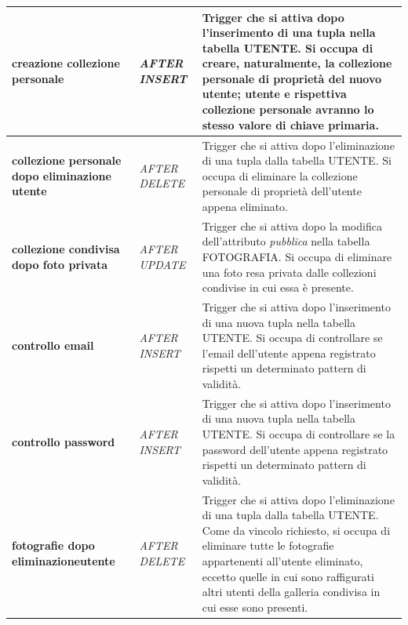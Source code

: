 \documentclass[a4paper]{article}
\begin{document}
	\begin{tabular}{p{130pt}p{130pt}p{145pt}}
		\textbf{creazione\textunderscore
		collezione\newline
		personale} & 
		\emph{AFTER INSERT} & 
		Trigger che si attiva dopo l'inserimento di una
		tupla
		nella tabella UTENTE. Si occupa di creare,
		naturalmente, la collezione personale di proprietà
		del nuovo utente; utente e rispettiva collezione
		personale
		avranno lo stesso valore di chiave primaria.
		\\
		\hline
		
		\textbf{collezione\textunderscore
		personale \newline dopo\textunderscore
		eliminazione \newline utente} & 
		\emph{AFTER DELETE} & 
		Trigger che si attiva dopo l'eliminazione di una
		tupla
		dalla tabella UTENTE. Si occupa di eliminare la
		collezione personale di proprietà
		dell'utente appena eliminato.
		\\
		\hline
		
		\textbf{collezione\textunderscore
		condivisa \newline dopo\textunderscore
		foto \newline privata} & 
		\emph{AFTER UPDATE} & 
		Trigger che si attiva dopo la modifica
		dell'attributo \emph{pubblica} nella tabella
		FOTOGRAFIA.
		Si
		occupa di eliminare una foto resa privata dalle
		collezioni condivise in cui essa è presente.
		\\
		\hline

		\textbf{controllo\textunderscore
		email} & 
		\emph{AFTER INSERT} & 
		Trigger che si attiva dopo l'inserimento di una nuova
		tupla nella tabella
		UTENTE.
		Si
		occupa di controllare se l'email dell'utente appena
		registrato rispetti un determinato pattern di
		validità.
		\\
		\hline

		\textbf{controllo\textunderscore
		password} & 
		\emph{AFTER INSERT} & 
		Trigger che si attiva dopo l'inserimento di una nuova
		tupla nella tabella
		UTENTE.
		Si
		occupa di controllare se la password dell'utente
		appena
		registrato rispetti un determinato pattern di
		validità.
		\\
		\hline
		
		\textbf{fotografie\textunderscore
		dopo\newline
		eliminazione\textunderscore utente} & 
		\emph{AFTER DELETE} & 
		Trigger che si attiva dopo l'eliminazione di una
		tupla
		dalla tabella UTENTE. Come da vincolo richiesto, si
		occupa di eliminare tutte le fotografie appartenenti
		all'utente
		eliminato,
		eccetto quelle in cui sono raffigurati altri
		utenti della galleria condivisa in cui esse sono
		presenti.
		\\
		\hline
		

\end{tabular}
\end{document}

